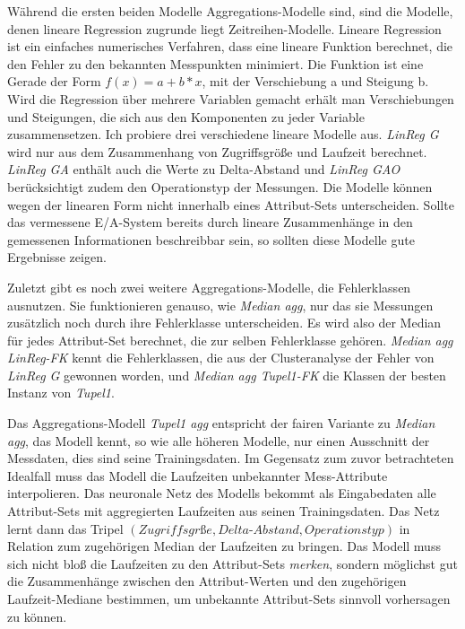 \documentclass[
	12pt,
	a4paper,
	BCOR10mm,
	DIV14,
	listof=totoc,
	bibliography=totoc,
	headsepline
]{scrreprt}
\begin{document}
Während die ersten beiden Modelle Aggregations-Modelle sind, sind die Modelle, denen lineare Regression zugrunde liegt Zeitreihen-Modelle.
Lineare Regression ist ein einfaches numerisches Verfahren, dass eine lineare Funktion berechnet, die den Fehler zu den bekannten Messpunkten minimiert. Die Funktion ist eine Gerade der Form $f(x) = a + b*x$, mit der Verschiebung a und Steigung b. Wird die Regression über mehrere Variablen gemacht erhält man Verschiebungen und Steigungen, die sich aus den Komponenten zu jeder Variable zusammensetzen.
Ich probiere drei verschiedene lineare Modelle aus.
\textit{LinReg G} wird nur aus dem Zusammenhang von Zugriffsgröße und Laufzeit berechnet.
\textit{LinReg GA} enthält auch die Werte zu Delta-Abstand und \textit{LinReg GAO} berücksichtigt zudem den Operationstyp der Messungen.
Die Modelle können wegen der linearen Form nicht innerhalb eines Attribut-Sets unterscheiden. Sollte das vermessene E/A-System bereits durch lineare Zusammenhänge in den gemessenen Informationen beschreibbar sein, so sollten diese Modelle gute Ergebnisse zeigen.

Zuletzt gibt es noch zwei weitere Aggregations-Modelle, die Fehlerklassen ausnutzen.
Sie funktionieren genauso, wie \textit{Median agg}, nur das sie Messungen zusätzlich noch durch ihre Fehlerklasse unterscheiden. Es wird also der Median für jedes Attribut-Set berechnet, die zur selben Fehlerklasse gehören.
\textit{Median agg LinReg-FK} kennt die Fehlerklassen, die aus der Clusteranalyse der Fehler von \textit{LinReg G} gewonnen worden, und \textit{Median agg Tupel1-FK} die Klassen der besten Instanz von \textit{Tupel1}.

Das Aggregations-Modell \textit{Tupel1 agg} entspricht der fairen Variante zu \textit{Median agg}, das Modell kennt, so wie alle höheren Modelle, nur einen Ausschnitt der Messdaten, dies sind seine Trainingsdaten. Im Gegensatz zum zuvor betrachteten Idealfall muss das Modell die Laufzeiten unbekannter Mess-Attribute interpolieren. Das neuronale Netz des Modells bekommt als Eingabedaten alle Attribut-Sets mit aggregierten Laufzeiten aus seinen Trainingsdaten. Das Netz lernt dann das Tripel $(Zugriffsgr\text{ß}e, Delta\text{-}Abstand, Operationstyp)$ in Relation zum zugehörigen Median der Laufzeiten zu bringen.
Das Modell muss sich nicht bloß die Laufzeiten zu den Attribut-Sets \textit{merken}, sondern möglichst gut die Zusammenhänge zwischen den Attribut-Werten und den zugehörigen Laufzeit-Mediane bestimmen, um unbekannte Attribut-Sets sinnvoll vorhersagen zu können.
\end{document}
